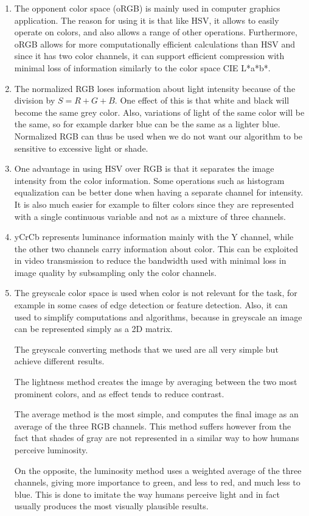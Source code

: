 \documentclass{article}
\begin{document}
\begin{enumerate}
    \item The opponent color space (oRGB) is mainly used in computer graphics application. The reason for using it is that like HSV, it allows to easily operate on colors, and also allows a range of other operations. Furthermore, oRGB allows for more computationally efficient calculations than HSV and since it has two color channels, it can support efficient compression with minimal loss of information similarly to the color space CIE L*a*b*.
    
    \item The normalized RGB loses information about light intensity because of the division by $S = R+G+B$. One effect of this is that white and black will become the same grey color. Also, variations of light of the same color will be the same, so for example darker blue can be the same as a lighter blue.
	Normalized RGB can thus be used when we do not want our algorithm to be sensitive to excessive light or shade.
	
	\item One advantage in using HSV over RGB is that it separates the image intensity from the color information. Some operations such as histogram equalization can be better done when having a separate channel for intensity. It is also much easier for example to filter colors since they are represented with a single continuous variable and not as a mixture of three channels.
	
	\item yCrCb represents luminance information mainly with the Y channel, while the other two channels carry information about color. This can be exploited in video transmission to reduce the bandwidth used with minimal loss in image quality by subsampling only the color channels.
	
	\item The greyscale color space is used when color is not relevant for the task, for example in some cases of edge detection or feature detection. Also, it can used to simplify computations and algorithms, because in greyscale an image can be represented simply as a 2D matrix. 
	
	The greyscale converting methods that we used are all very simple but achieve different results.
	
	The lightness method creates the image by averaging between the two most prominent colors, and as effect tends to reduce contrast.
	
	The average method is the most simple, and computes the final image as an average of the three RGB channels. This method suffers however from the fact that shades of gray are not represented in a similar way to how humans perceive luminosity.
	
	On the opposite, the luminosity method uses a weighted average of the three channels, giving more importance to green, and less to red, and much less to blue. This is done to imitate the way humans perceive light and in fact usually produces the most visually plausible results. 
	
\end{enumerate}
\end{document}
